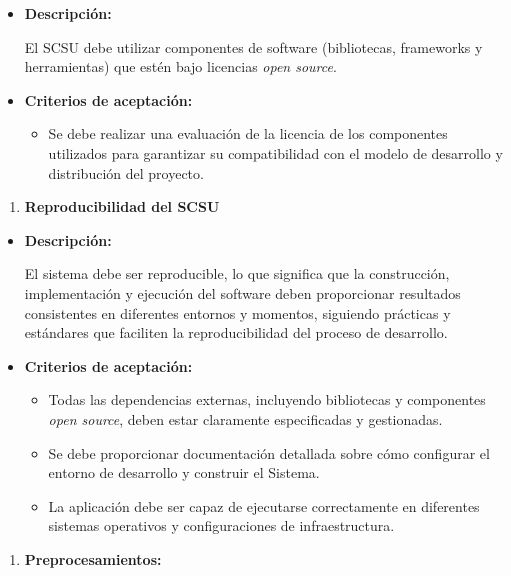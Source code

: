 \documentclass[
  12pt,
  openany]{book}
\providecommand{\tightlist}{%
  \setlength{\itemsep}{0pt}\setlength{\parskip}{0pt}}
\begin{document}
\begin{itemize}
\item
  \textbf{Descripción:}

  El SCSU debe utilizar componentes de software (bibliotecas, frameworks y herramientas) que estén bajo licencias \emph{open source}.
\item
  \textbf{Criterios de aceptación:}

  \begin{itemize}
  \tightlist
  \item
    Se debe realizar una evaluación de la licencia de los componentes utilizados para garantizar su compatibilidad con el modelo de desarrollo y distribución del proyecto.
  \end{itemize}
\end{itemize}

\begin{enumerate}
\def\labelenumi{\arabic{enumi}.}
\setcounter{enumi}{2}
\tightlist
\item
  \textbf{Reproducibilidad del SCSU}
\end{enumerate}

\begin{itemize}
\item
  \textbf{Descripción:}

  El sistema debe ser reproducible, lo que significa que la construcción, implementación y ejecución del software deben proporcionar resultados consistentes en diferentes entornos y momentos, siguiendo prácticas y estándares que faciliten la reproducibilidad del proceso de desarrollo.
\item
  \textbf{Criterios de aceptación:}

  \begin{itemize}
  \item
    Todas las dependencias externas, incluyendo bibliotecas y componentes \emph{open source}, deben estar claramente especificadas y gestionadas.
  \item
    Se debe proporcionar documentación detallada sobre cómo configurar el entorno de desarrollo y construir el Sistema.
  \item
    La aplicación debe ser capaz de ejecutarse correctamente en diferentes sistemas operativos y configuraciones de infraestructura.
  \end{itemize}
\end{itemize}

\begin{enumerate}
\def\labelenumi{\arabic{enumi}.}
\setcounter{enumi}{3}
\tightlist
\item
  \textbf{Preprocesamientos:}
\end{enumerate}
\end{document}
